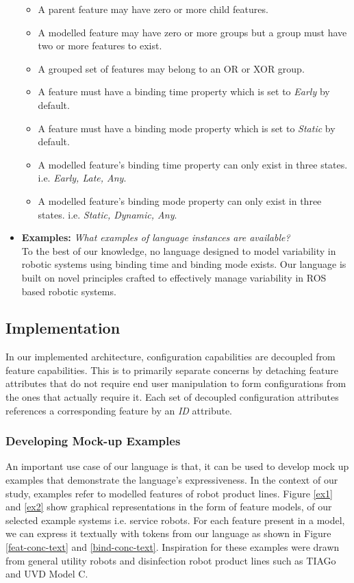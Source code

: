 \documentclass[conference]{IEEEtran}
\begin{document}
\begin{itemize}
\begin{itemize}
            \item A parent feature may have zero or more child features.
            \item A modelled feature may have zero or more groups but a group must have two or more features to exist.
            \item A grouped set of features may belong to an OR or XOR group.
            \item A feature must have a binding time property which is set to \textit{Early} by default.
            \item A feature must have a binding mode property which is set to \textit{Static} by default.
            \item A modelled feature's binding time property can only exist in three states. i.e. \textit{Early, Late, Any}.
            \item A modelled feature's binding mode property can only exist in three states. i.e. \textit{Static, Dynamic, Any}.
        \end{itemize}
        \item \textbf{Examples: }\textit{What examples of language instances are available?}\\
        To the best of our knowledge, no language designed to model variability in robotic systems using binding time and binding mode exists. Our language is built on novel principles crafted to effectively manage variability in ROS based robotic systems.
    \end{itemize}
    
\subsection{Implementation}
In our implemented architecture, configuration capabilities are decoupled from feature capabilities. This is to primarily separate concerns by detaching feature attributes that do not require end user manipulation to form configurations from the ones that actually require it. Each set of decoupled configuration attributes references a corresponding feature by an \textit{ID} attribute.

\subsubsection{Developing Mock-up Examples}
An important use case of our language is that, it can be used to develop mock up examples that demonstrate the language's expressiveness. In the context of our study, examples refer to modelled features of robot product lines. Figure \ref{ex1} and \ref{ex2} show graphical representations in the form of feature models, of our selected example systems i.e. service robots. For each feature present in a model, we can express it textually with tokens from our language as shown in Figure \ref{feat-conc-text} and \ref{bind-conc-text}. Inspiration for these examples were drawn from general utility robots and disinfection robot product lines such as TIAGo and UVD Model C.
    
\end{document}

